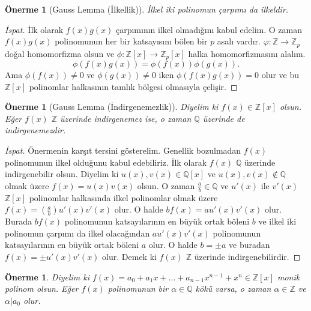 \documentclass[draft]{article}
\newtheorem{prop}[thm]{Önerme}
\theoremstyle{definition}
\theoremstyle{remark}
\begin{document}
		    \begin{prop}[Gauss Lemma (İlkellik)]
		        İlkel iki polinomun çarpımı da ilkeldir.
		    \end{prop}
		    
		    \begin{proof}[İspat]
		        İlk olarak $f(x)g(x)$ çarpımının ilkel olmadığını kabul edelim. O zaman $f(x)g(x)$ polinomunun her bir katsayısını bölen bir $p$ asalı vardır.
		        $\varphi: \mathbb{Z} \to \mathbb{Z}_p$ doğal homomorfizma olsun ve $\phi: \mathbb{Z}[x] \to \mathbb{Z}_p[x]$ halka homomorfizmasını alalım.
		        \begin{equation*}
		            \phi(f(x)g(x)) = \phi(f(x))\phi(g(x)).
		        \end{equation*}
		        Ama $\phi(f(x)) \neq 0$ ve $\phi(g(x)) \neq 0$ iken $\phi(f(x)g(x)) = 0$ olur ve bu $\mathbb{Z}[x]$ polinomlar halkasının tamlık bölgesi olmasıyla çelişir.
		    \end{proof}
			
			\begin{prop}[Gauss Lemma (İndirgenemezlik)]
			    Diyelim ki $f(x) \in \mathbb{Z}[x]$ olsun. Eğer $f(x)$ $\mathbb{Z}$ üzerinde indirgenemez ise, o zaman $\mathbb{Q}$ üzerinde de indirgenemezdir.
			\end{prop}
			
			\begin{proof}[İspat]
			    Önermenin karşıt tersini gösterelim. Genellik bozulmadan $f(x)$ polinomunun ilkel olduğunu kabul edebiliriz. İlk olarak $f(x)$ $\mathbb{Q}$ üzerinde indirgenebilir olsun. Diyelim ki $u(x), v(x) \in \mathbb{Q}[x]$ ve $u(x), v(x) \notin \mathbb{Q}$ olmak üzere $f(x) = u(x)v(x)$ olsun. O zaman $\frac{a}{b} \in \mathbb{Q}$ ve $u'(x)$ ile $v'(x)$ $\mathbb{Z}[x]$ polinomlar halkasında ilkel polinomlar olmak üzere $f(x) = (\frac{a}{b})u'(x)v'(x)$ olur. O halde $bf(x) = au'(x)v'(x)$ olur. Burada $bf(x)$ polinomunun katsayılarının en büyük ortak böleni $b$ ve ilkel iki polinomun çarpımı da ilkel olacağından $au'(x)v'(x)$ polinomunun katsayılarının en büyük ortak böleni $a$ olur. O halde $b = \pm a$ ve buradan $f(x) = \pm u'(x)v'(x)$ olur. Demek ki $f(x)$ $\mathbb{Z}$ üzerinde indirgenebilirdir.
			\end{proof}
			
			\begin{prop}
			    Diyelim ki $f(x) = a_0 + a_1x + \dots + a_{n - 1}x^{n - 1} + x^n \in \mathbb{Z}[x]$ monik polinom olsun. Eğer $f(x)$ polinomunun bir $\alpha \in \mathbb{Q}$ kökü varsa, o zaman $\alpha \in \mathbb{Z}$ ve $\alpha | a_0$ olur.
			\end{prop}
			
\end{document}
